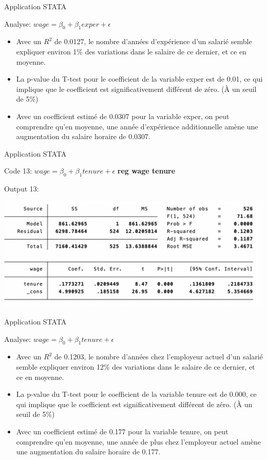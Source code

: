 \documentclass{beamer}
\begin{document}
\begin{frame}{Application STATA}
\begin{block}{Analyse: $wage = \beta_0 + \beta_1 exper  + \epsilon$}
\begin{itemize}
\item Avec un $R^2$ de 0.0127, le nombre d’années d’expérience d'un salarié semble expliquer environ 1\% des variations dans le salaire de ce dernier, et ce en moyenne.
\item La p-value du T-test pour le coefficient de la variable exper est de 0.01, ce qui implique que le coefficient est significativement différent de zéro. (À un seuil de 5\%)
\item Avec un coefficient estimé de 0.0307 pour la variable exper, on peut comprendre qu’en moyenne, une année d’expérience additionnelle amène une augmentation du salaire horaire de 0.0307.
\end{itemize}
\end{block}
\end{frame}
\begin{frame}{Application STATA}
\begin{block}{Code 13: $wage = \beta_0 + \beta_1 tenure  + \epsilon$}
\textbf{reg wage tenure}
\end{block}

\begin{block}{Output 13:}
\begin{center}
\includegraphics[scale=.5]{REG3.png}
\end{center}
\end{block}
\end{frame}


\begin{frame}{Application STATA}
\begin{block}{Analyse: $wage = \beta_0 + \beta_1 tenure  + \epsilon$}
\begin{itemize}
\item Avec un $R^2$ de 0.1203, le nombre d’années chez l'employeur actuel d'un salarié semble expliquer environ 12\% des variations dans le salaire de ce dernier, et ce en moyenne.
\item La p-value du T-test pour le coefficient de la variable tenure est de 0.000, ce qui implique que le coefficient est significativement différent de zéro. (À un seuil de 5\%)
\item Avec un coefficient estimé de 0.177 pour la variable tenure, on peut comprendre qu’en moyenne, une année de plus chez l'employeur actuel amène une augmentation du salaire horaire de 0.177.
\end{itemize}
\end{block}
\end{frame}
\end{document}
